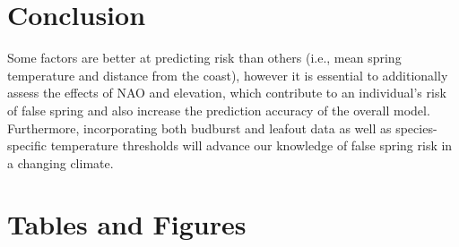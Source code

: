 \documentclass{article}\usepackage[]{graphicx}\usepackage[]{color}
\begin{document}
\section*{Conclusion}
 Some factors are better at predicting risk than others (i.e., mean spring temperature and distance from the coast), however it is essential to additionally assess the effects of NAO and elevation, which contribute to an individual's risk of false spring and also increase the prediction accuracy of the overall model.  %
Furthermore, incorporating both budburst and leafout data as well as species-specific temperature thresholds will advance our knowledge of false spring risk in a changing climate. 





\section*{Tables and Figures} 
\end{document}
